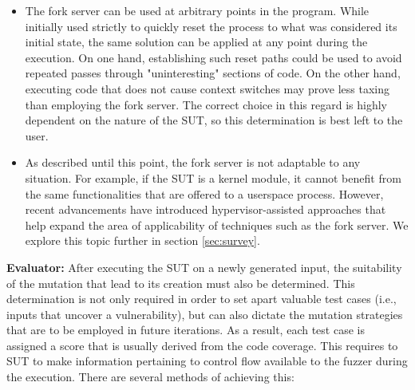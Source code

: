 \begin{itemize}
    \item The fork server can be used at arbitrary points in the program. While initially used strictly to quickly reset the process to what was considered its initial state, the same solution can be applied at any point during the execution. On one hand, establishing such reset paths could be used to avoid repeated passes through "uninteresting" sections of code. On the other hand, executing code that does not cause context switches may prove less taxing than employing the fork server. The correct choice in this regard is highly dependent on the nature of the SUT, so this determination is best left to the user.

    \item As described until this point, the fork server is not adaptable to any situation. For example, if the SUT is a kernel module, it cannot benefit from the same functionalities that are offered to a userspace process. However, recent advancements have introduced hypervisor-assisted approaches that help expand the area of applicability of techniques such as the fork server. We explore this topic further in section \ref{sec:survey}.
\end{itemize}

\textbf{Evaluator:} After executing the SUT on a newly generated input, the suitability of the mutation that lead to its creation must also be determined. This determination is not only required in order to set apart valuable test cases (i.e., inputs that uncover a vulnerability), but can also dictate the mutation strategies that are to be employed in future iterations. As a result, each test case is assigned a score that is usually derived from the code coverage. This requires to SUT to make information pertaining to control flow available to the fuzzer during the execution. There are several methods of achieving this:

